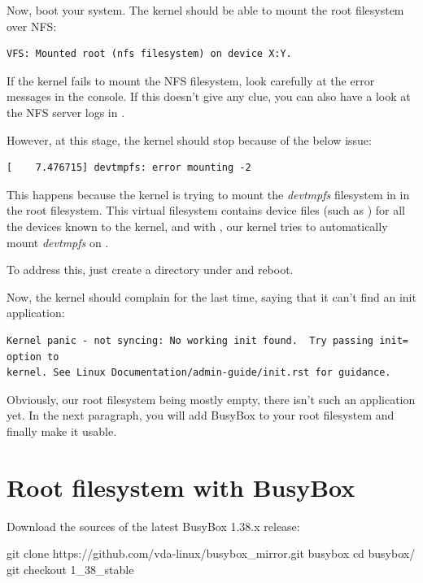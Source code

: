Now, boot your system. The kernel should be able to mount the root
filesystem over NFS:

\begin{verbatim}
VFS: Mounted root (nfs filesystem) on device X:Y.
\end{verbatim}

If the kernel fails to mount the NFS filesystem, look carefully at the
error messages in the console. If this doesn't give any clue, you can
also have a look at the NFS server logs in .

However, at this stage, the kernel should stop because of the below
issue:

\begin{verbatim}
[    7.476715] devtmpfs: error mounting -2
\end{verbatim}

This happens because the kernel is trying to mount the {\em devtmpfs}
filesystem in  in the root filesystem. This virtual
filesystem contains device files (such as ) for all the
devices known to the kernel, and with ,
our kernel tries to automatically mount {\em devtmpfs} on .

To address this, just create a  directory under 
and reboot.

Now, the kernel should complain for the last time, saying that it can't
find an init application:

\begin{verbatim}
Kernel panic - not syncing: No working init found.  Try passing init= option to
kernel. See Linux Documentation/admin-guide/init.rst for guidance.
\end{verbatim}

Obviously, our root filesystem being mostly empty, there isn't such an
application yet. In the next paragraph, you will add BusyBox to your root
filesystem and finally make it usable.

\section{Root filesystem with BusyBox}

Download the sources of the latest BusyBox 1.38.x release:

\begin{bashinput}
git clone https://github.com/vda-linux/busybox_mirror.git busybox
cd busybox/
git checkout 1_38_stable
\end{bashinput}


